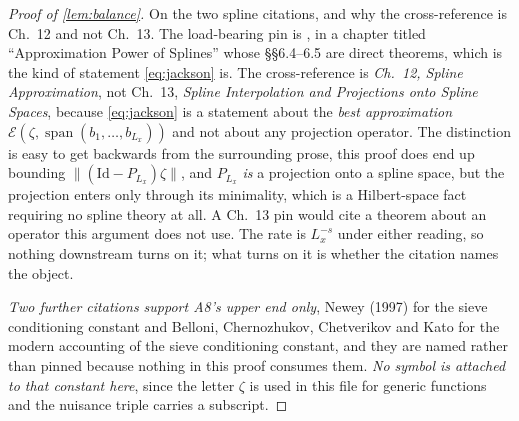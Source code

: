 \begin{proof}[Proof of \cref{lem:balance}]
On the two spline citations, and why the cross-reference is \textup{Ch.~12} and not
\textup{Ch.~13}. The load-bearing pin is \citet[Thm.~6.27]{schumaker2007}, in a chapter titled
``Approximation Power of Splines'' whose §§6.4--6.5 are direct theorems, which is the kind of
statement \eqref{eq:jackson} is. The \citet{devorelorentz1993} cross-reference is \emph{Ch.~12, Spline
Approximation}, not Ch.~13, \emph{Spline Interpolation and Projections onto Spline Spaces}, because
\eqref{eq:jackson} is a statement about the \emph{best approximation}
$\mathcal E(\zeta,\operatorname{span}(b_1,\dots,b_{L_x}))$ and not
about any projection operator. The distinction is easy to get backwards from the surrounding prose, 
this proof does end up bounding $\|(\mathrm{Id}-P_{L_x})\zeta\|$, and $P_{L_x}$ \emph{is} a projection onto a
spline space, but the projection enters only through its minimality, which is a Hilbert-space fact
requiring no spline theory at all. A Ch.~13 pin would cite a theorem about an operator this
argument does not use. The rate is $L_x^{-s}$ under either reading, so nothing downstream turns on it;
what turns on it is whether the citation names the object.

\emph{Two further citations support A8's \textup{upper} end only}, Newey (1997) for the sieve
conditioning constant and Belloni, Chernozhukov, Chetverikov and Kato for the modern accounting of the
sieve conditioning constant, and they are named rather than pinned because nothing in this proof
consumes them. \emph{No symbol is attached to that constant here}, since the letter $\zeta$ is used in
this file for generic functions and the nuisance triple carries a subscript.
\end{proof}

